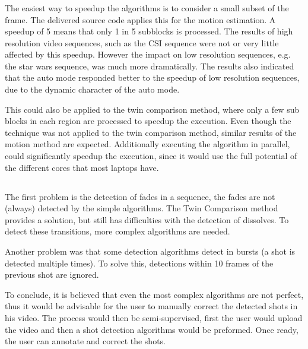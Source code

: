 \subsubsection[How would you further improve this method in terms of processing speed?]{}
The easiest way to speedup the algorithms is to consider a small subset of the frame. The delivered source code applies this for the motion estimation. A speedup of 5 means that only 1 in 5 subblocks is processed. The results of high resolution video sequences, such as the CSI sequence were not or very little affected by this speedup. However the impact on low resolution sequences, e.g. the star wars sequence, was much more dramatically. The results also indicated that the auto mode responded better to the speedup of low resolution sequences, due to the dynamic character of the auto mode.

This could also be applied to the twin comparison method, where only a few sub blocks in each region are processed to speedup the execution. Even though the technique was not applied to the twin comparison method, similar results of the motion method are expected. Additionally executing the algorithm in parallel, could significantly speedup the execution, since it would use the full potential of the different cores that most laptops have.
\\
\subsection[What is the obvious shortcoming in practical scenarios, that the different video
shot detection methods have in common, and how would you deal with this?]{}
The first problem is the detection of fades in a sequence, the fades are not (always) detected by the simple algorithms. The Twin Comparison method provides a solution, but still has difficulties with the detection of dissolves. To detect these transitions, more complex algorithms are needed. 

Another problem was that some detection algorithms detect in bursts (a shot is detected multiple times). To solve this, detections within 10 frames of the previous shot are ignored.

To conclude, it is believed that even the most complex algorithms are not perfect, thus it would be advisable for the user to manually correct the detected shots in his video. The process would then be semi-supervised, first the user would upload the video and then a shot detection algorithms would be preformed. Once ready, the user can annotate and correct the shots. 
\\

